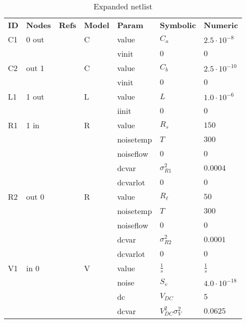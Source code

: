 \begin{table}[H]
\centering
\begin{tabular}[c]{lllllll}
\textbf{ID} & \textbf{Nodes} & \textbf{Refs} & \textbf{Model} & \textbf{Param} & \textbf{Symbolic} & \textbf{Numeric} \\ 
\rowcolor{myyellow}
\small{C1} &\small{0 out } & &\small{C} &\small{value} &$C_{a}$ &$2.5 \cdot 10^{-8}$ \\ 
 & & & &\small{vinit} &$0$ &$0$ \\ 
\rowcolor{myyellow}
\small{C2} &\small{out 1 } & &\small{C} &\small{value} &$C_{b}$ &$2.5 \cdot 10^{-10}$ \\ 
 & & & &\small{vinit} &$0$ &$0$ \\ 
\rowcolor{myyellow}
\small{L1} &\small{1 out } & &\small{L} &\small{value} &$L$ &$1.0 \cdot 10^{-6}$ \\ 
 & & & &\small{iinit} &$0$ &$0$ \\ 
\rowcolor{myyellow}
\small{R1} &\small{1 in } & &\small{R} &\small{value} &$R_{s}$ &$150$ \\ 
 & & & &\small{noisetemp} &$T$ &$300$ \\ 
\rowcolor{myyellow}
 & & & &\small{noiseflow} &$0$ &$0$ \\ 
 & & & &\small{dcvar} &$\sigma_{R1}^{2}$ &$0.0004$ \\ 
\rowcolor{myyellow}
 & & & &\small{dcvarlot} &$0$ &$0$ \\ 
\small{R2} &\small{out 0 } & &\small{R} &\small{value} &$R_{\ell}$ &$50$ \\ 
\rowcolor{myyellow}
 & & & &\small{noisetemp} &$T$ &$300$ \\ 
 & & & &\small{noiseflow} &$0$ &$0$ \\ 
\rowcolor{myyellow}
 & & & &\small{dcvar} &$\sigma_{R2}^{2}$ &$0.0001$ \\ 
 & & & &\small{dcvarlot} &$0$ &$0$ \\ 
\rowcolor{myyellow}
\small{V1} &\small{in 0 } & &\small{V} &\small{value} &$\frac{1}{s}$ &$\frac{1}{s}$ \\ 
 & & & &\small{noise} &$S_{v}$ &$4.0 \cdot 10^{-18}$ \\ 
\rowcolor{myyellow}
 & & & &\small{dc} &$V_{DC}$ &$5$ \\ 
 & & & &\small{dcvar} &$V_{DC}^{2} \sigma_{V}^{2}$ &$0.0625$ \\ 
\end{tabular}
\caption{Expanded netlist}
\label{tab-expanded}
\end{table}

